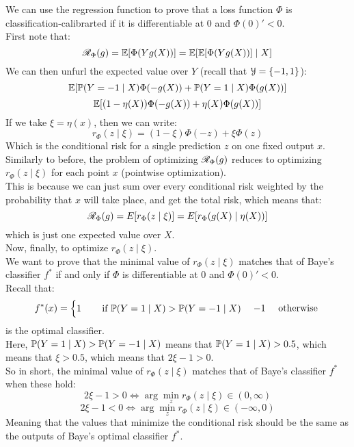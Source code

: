 \documentclass[12pt]{article}
\begin{document}
We can use the regression function
to prove that a loss function $\Phi$
is classification-calibrarted
if it is differentiable at $0$
and $\Phi(0)' < 0$. \\

First note that:
\[ \mathscr{R}_\Phi(g)
= \mathbb{E}[\Phi(Yg(X))]
= \mathbb{E}[\mathbb{E}[\Phi(Yg(X))] \mid X ] \]
We can then unfurl the expected value
over $Y$
(recall that $\mathcal{Y} = \{-1, 1\}$):
\[ \mathbb{E}[\mathbb{P}(Y = -1 \mid X)\Phi(-g(X))
+ \mathbb{P}(Y = 1 \mid X)\Phi(g(X))] \]
\[ \mathbb{E}[(1-\eta(X))\Phi(-g(X))
+ \eta(X)\Phi(g(X))] \]
If we take $\xi = \eta(x)$,
then we can write:
\[ r_\Phi(z \mid \xi)
= (1-\xi)\Phi(-z) + \xi\Phi(z) \]
Which is the conditional risk for
a single prediction $z$
on one fixed output $x$. \\

Similarly to before, the problem of optimizing
$\mathscr{R}_\Phi(g)$ reduces to optimizing
$r_\Phi(z \mid \xi)$ for each point $x$
(pointwise optimization). \\
This is because we can just sum over
every conditional risk weighted by the probability
that $x$ will take place,
and get the total risk,
which means that:
\[ \mathscr{R}_\Phi(g) = E[r_\Phi(z \mid \xi)]
= E[r_\Phi(g(X) \mid \eta(X))] \]
which is just one expected value over $X$. \\

Now, finally, to optimize $r_\Phi(z \mid \xi)$. \\
We want to prove that 
the minimal value of $r_\Phi(z \mid \xi)$
matches that of Baye's classifier $f^*$
if and only if $\Phi$
is differentiable at $0$
and $\Phi(0)' < 0$. \\

Recall that:
\[ f^*(x) = \begin{cases} 1 \quad \;\;\; \text{ if }
\mathbb{P}(Y = 1 \mid X) >
\mathbb{P}(Y = -1 \mid X) \end{cases}
{-1 \quad \text{ otherwise }} \]
is the optimal classifier. \\

Here, $\mathbb{P}(Y = 1 \mid X) > \mathbb{P}(Y = -1 \mid X)$
means that $\mathbb{P}(Y = 1 \mid X) > 0.5$,
which means that $\xi > 0.5$,
which means that $2\xi - 1 > 0$. \\
So in short, 
the minimal value of $r_\Phi(z \mid \xi)$
matches that of Baye's classifier $f^*$ when
these hold:
\[ 2\xi - 1 > 0 \iff 
\arg \min_z r_\Phi(z \mid \xi) \in (0, \infty) \]
\[ 2\xi - 1 < 0 \iff 
\arg \min_z r_\Phi(z \mid \xi) \in (-\infty, 0) \]
Meaning that the values that minimize the
conditional risk
should be the same as the outputs of Baye's
optimal classifier $f^*$. \\
\end{document}
